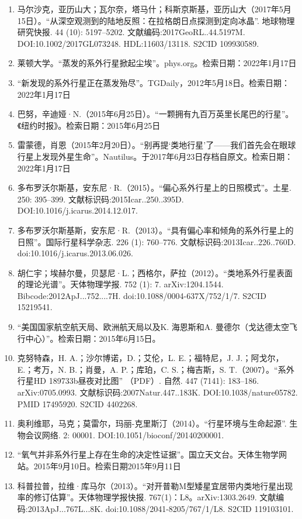 \begin{enumerate}
\item 马尔沙克，亚历山大；瓦尔奈，塔马什；科斯京斯基，亚历山大（2017年5月15日）。“从深空观测到的陆地反照：在拉格朗日点探测到定向冰晶”. 地球物理研究快报. 44 (10): 5197–5202. 文献编码:2017GeoRL..44.5197M. DOI:10.1002/2017GL073248. HDL:11603/13118. S2CID 109930589.
\item 莱顿大学。“蒸发的系外行星掀起尘埃”。phys.org。检索日期：2022年1月17日
\item “新发现的系外行星正在蒸发殆尽”。TGDaily，2012年5月18日。检索日期：2022年1月17日
\item 巴努，辛迪娅·N.（2015年6月25日）。“一颗拥有九百万英里长尾巴的行星”。《纽约时报》。检索日期：2015年6月25日
\item 雷蒙德，肖恩（2015年2月20日）。“别再提‘类地行星’了——我们首先会在眼球行星上发现外星生命”。Nautilus。于2017年6月23日存档自原文。检索日期：2022年1月17日
\item 多布罗沃尔斯基，安东尼·R.（2015）。“偏心系外行星上的日照模式”。土星. 250: 395–399. 文献标识码:2015Icar..250..395D. DOI:10.1016/j.icarus.2014.12.017.
\item 多布罗沃尔斯基斯，安东尼·R.（2013）。“具有偏心率和倾角的系外行星上的日照”。国际行星科学杂志. 226 (1): 760–776. 文献标识码:2013Icar..226..760D. doi:10.1016/j.icarus.2013.06.026.
\item 胡仁宇；埃赫尔曼，贝瑟尼·L.；西格尔，萨拉（2012）。“类地系外行星表面的理论光谱”。天体物理学报. 752 (1): 7. arXiv:1204.1544. Bibcode:2012ApJ...752....7H. doi:10.1088/0004-637X/752/1/7. S2CID 15219541.
\item “美国国家航空航天局、欧洲航天局以及K. 海恩斯和A. 曼德尔（戈达德太空飞行中心）”。检索日期：2015年6月15日。
\item 克努特森，H. A.；沙尔博诺，D.；艾伦，L. E.；福特尼，J. J.；阿戈尔，E.；考万，N. B.；肖曼，A. P.；库珀，C. S.；梅吉斯，S. T.（2007）。“系外行星HD 189733b昼夜对比图” （PDF）. 自然. 447 (7141): 183–186. arXiv:0705.0993. 文献标识码:2007Natur.447..183K. DOI:10.1038/nature05782. PMID 17495920. S2CID 4402268.
\item 奥利维耶，马克；莫雷尔，玛丽-克里斯汀（2014）。“行星环境与生命起源”. 生物会议网络. 2: 00001. DOI:10.1051/bioconf/20140200001.
\item “氧气并非系外行星上存在生命的决定性证据”。国立天文台。天体生物学网站。2015年9月10日。检索日期2015年9月11日
\item 科普拉普，拉维·库马尔（2013）。“对开普勒M型矮星宜居带内类地行星出现率的修订估算”。天体物理学报快报. 767(1)：L8。arXiv:1303.2649. 文献编码:2013ApJ...767L...8K. doi:10.1088/2041-8205/767/1/L8. S2CID 119103101.

\end{enumerate}
